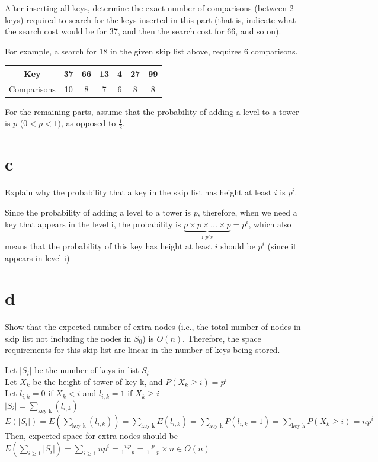 \documentclass[12pt]{article}
\begin{document}
\begin{enumerate}
		After inserting all keys, determine the exact number of comparisons (between 2 keys) required to search for the keys inserted in this part (that is, indicate what the search cost would be for 37, and then the search cost for 66, and so on).
		
		For example, a search for 18 in the given skip list above, requires 6 comparisons.
		
		\begin{center}
			\begin{tabular}{|c||c|c|c|c|c|c|} \hline
				Key &  37 &  66 &  13 &  4 & 27 & 99 \\ \hline
				Comparisons & 10  & 8  & 7  & 6  & 8 & 8 \\ \hline
			\end{tabular}
		\end{center}
		
		For the remaining parts, assume that the probability of adding a level to a tower is $p$ ($0 < p < 1)$, as opposed to $\frac{1}{2}$.
		
		\part{c} Explain why the probability that a key in the skip list has height at least $i$ is $p^i$.
		
		Since the probability of adding a level to a tower is $p$, therefore, when we need a key that appears in the level i, the probability is $\underbrace{p \times p \times ... \times p}_{\text{i }p's} = p^i$, which also means that the probability of this key has height at least $i$ should be $p^i$ (since it appears in level i)
		
		\part{d} Show that the expected number of extra nodes (i.e., the total number of nodes in skip list not including the nodes in $S_0$) is $O(n)$. 
		Therefore, the space requirements for this skip list are linear in the number of keys being stored.
		
		Let $|S_i|$ be the number of keys in list $S_i$\\
		Let $X_k$ be the height of tower of key k, and $P(X_k\geq i)=p^i$\\
		Let $l_{i,k} = 0$ if $X_k < i$ and $l_{i,k} = 1$ if $X_k \geq i$\\
		$|S_i|=\sum_{\text{key k}} (l_{i,k})$\\
		$E(|S_i|)=E(\sum_{\text{key k}} (l_{i,k}))=\sum_{\text{key k}} E(l_{i,k}) = \sum_{\text{key k}} P(l_{i,k} = 1)=\sum_{\text{key k}} P(X_k\geq i)=np^i$\\
		Then, expected space for extra nodes should be $E(\sum_{i\geq 1}|S_i|) = \sum_{i\geq 1} np^i = \frac{np}{1-p} = \frac{p}{1-p} \times n \in O(n)$
		
	\end{enumerate}
	
\end{document}
